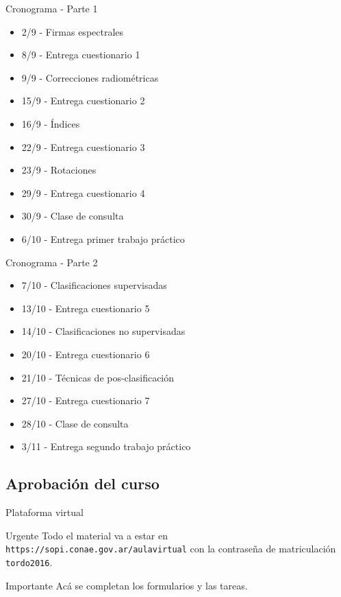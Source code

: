 \documentclass[]{beamer}
\begin{document}
\begin{frame}{Cronograma - Parte 1}
  \begin{itemize}
    \item 2/9 - Firmas espectrales
    \item 8/9 - Entrega cuestionario 1
    \item 9/9 - Correcciones radiométricas
    \item 15/9 - Entrega cuestionario 2
    \item 16/9 - Índices
    \item 22/9 - Entrega cuestionario 3
    \item 23/9 - Rotaciones
    \item 29/9 - Entrega cuestionario 4
    \item 30/9 - Clase de consulta
    \item 6/10 - Entrega primer trabajo práctico
  \end{itemize}
\end{frame}
\begin{frame}{Cronograma - Parte 2}
  \begin{itemize}
    \item 7/10 - Clasificaciones supervisadas
    \item 13/10 - Entrega cuestionario 5
    \item 14/10 - Clasificaciones no supervisadas
    \item 20/10 - Entrega cuestionario 6
    \item 21/10 - Técnicas de pos-clasificación
    \item 27/10 - Entrega cuestionario 7
    \item 28/10 - Clase de consulta
    \item 3/11 - Entrega segundo trabajo práctico
  \end{itemize}
\end{frame}

\subsection{Aprobación del curso}
\begin{frame}{Plataforma virtual}
  \begin{block}{Urgente}
    Todo el material va a estar en
    \texttt{https://sopi.conae.gov.ar/aulavirtual}\pause
    con la contraseña de matriculación
    \texttt{tordo2016}.
  \end{block}\pause
  \begin{alertblock}{Importante}
    Acá se completan los formularios y las tareas.
  \end{alertblock}
\end{frame}
\end{document}
